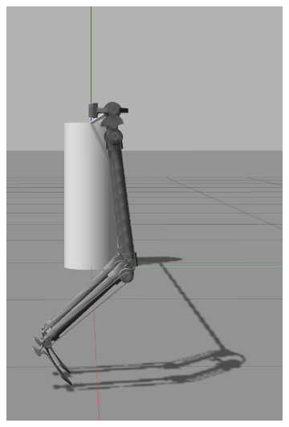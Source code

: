 \begin{figure}[ht!]
\begin{subfigure}[b]{0.16\textwidth}
        \includegraphics[width=\textwidth]{figures/gazebo_jumping_2}
    \end{subfigure}
    \begin{subfigure}[b]{0.16\textwidth}

\end{subfigure}
\end{figure}
